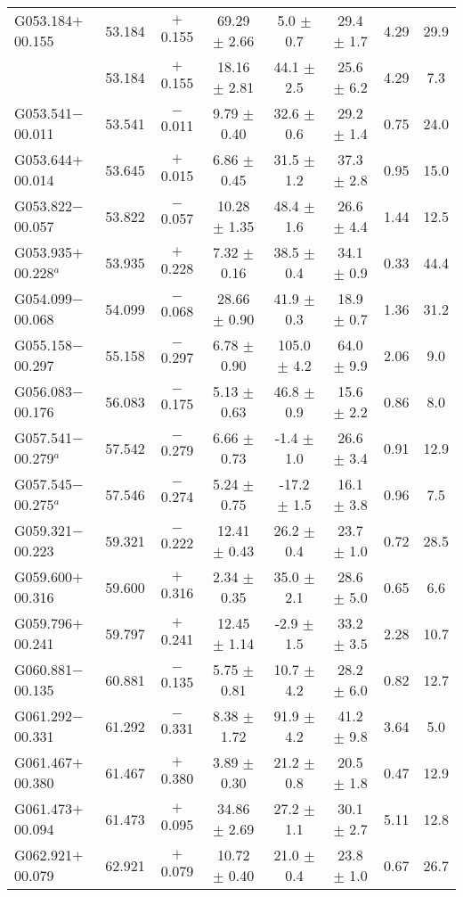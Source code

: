 \begin{ThreePartTable}
\begin{longtable}{lccccccc}
G053.184$+$00.155     &53.184&	$+$0.155	&69.29	$\pm$ 2.66	&5.0	$\pm$ 0.7	&29.4	$\pm$ 1.7	&4.29	&29.9\\
                      &53.184&	$+$0.155	&18.16	$\pm$ 2.81	&44.1	$\pm$ 2.5	&25.6	$\pm$ 6.2	&4.29	&7.3\\
G053.541$-$00.011     &53.541&	$-$0.011	&9.79	$\pm$ 0.40	&32.6	$\pm$ 0.6	&29.2	$\pm$ 1.4	&0.75	&24.0\\
G053.644$+$00.014     &53.645&	$+$0.015	&6.86	$\pm$ 0.45	&31.5	$\pm$ 1.2	&37.3	$\pm$ 2.8	&0.95	&15.0\\
G053.822$-$00.057     &53.822&	$-$0.057	&10.28	$\pm$ 1.35	&48.4	$\pm$ 1.6	&26.6	$\pm$ 4.4	&1.44	&12.5\\
G053.935$+$00.228$^a$ &53.935&	$+$0.228	&7.32	$\pm$ 0.16	&38.5	$\pm$ 0.4	&34.1	$\pm$ 0.9	&0.33	&44.4\\
G054.099$-$00.068     &54.099&	$-$0.068	&28.66	$\pm$ 0.90	&41.9	$\pm$ 0.3	&18.9	$\pm$ 0.7	&1.36	&31.2\\
G055.158$-$00.297     &55.158&	$-$0.297	&6.78	$\pm$ 0.90	&105.0	$\pm$ 4.2	&64.0	$\pm$ 9.9	&2.06	&9.0\\
G056.083$-$00.176     &56.083&	$-$0.175	&5.13	$\pm$ 0.63	&46.8	$\pm$ 0.9	&15.6	$\pm$ 2.2	&0.86	&8.0\\
G057.541$-$00.279$^a$ &57.542&	$-$0.279	&6.66	$\pm$ 0.73	&-1.4	$\pm$ 1.0	&26.6	$\pm$ 3.4	&0.91	&12.9\\
G057.545$-$00.275$^a$ &57.546&	$-$0.274	&5.24	$\pm$ 0.75	&-17.2	$\pm$ 1.5	&16.1	$\pm$ 3.8	&0.96	&7.5\\
G059.321$-$00.223     &59.321&	$-$0.222	&12.41	$\pm$ 0.43	&26.2	$\pm$ 0.4	&23.7	$\pm$ 1.0	&0.72	&28.5\\
G059.600$+$00.316     &59.600&	$+$0.316	&2.34	$\pm$ 0.35	&35.0	$\pm$ 2.1	&28.6	$\pm$ 5.0	&0.65	&6.6\\
G059.796$+$00.241     &59.797&	$+$0.241	&12.45	$\pm$ 1.14	&-2.9	$\pm$ 1.5	&33.2	$\pm$ 3.5	&2.28	&10.7\\
G060.881$-$00.135     &60.881&	$-$0.135	&5.75	$\pm$ 0.81	&10.7	$\pm$ 4.2	&28.2	$\pm$ 6.0	&0.82	&12.7\\
G061.292$-$00.331     &61.292&	$-$0.331	&8.38	$\pm$ 1.72	&91.9	$\pm$ 4.2	&41.2	$\pm$ 9.8	&3.64	&5.0\\
G061.467$+$00.380     &61.467&	$+$0.380	&3.89	$\pm$ 0.30	&21.2	$\pm$ 0.8	&20.5	$\pm$ 1.8	&0.47	&12.9\\
G061.473$+$00.094     &61.473&	$+$0.095	&34.86	$\pm$ 2.69	&27.2	$\pm$ 1.1	&30.1	$\pm$ 2.7	&5.11	&12.8\\
G062.921$+$00.079     &62.921&	$+$0.079	&10.72	$\pm$ 0.40	&21.0	$\pm$ 0.4	&23.8	$\pm$ 1.0	&0.67	&26.7\\

\end{longtable}
\end{ThreePartTable}

